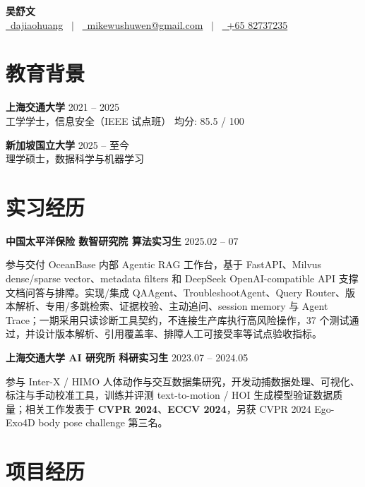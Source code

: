 \documentclass[a4paper,9pt]{extarticle}
\begin{document}
\pagestyle{empty}

\begin{center}
  {\LARGE\bfseries 吴舒文} \\[4pt]
  {\small
    \href{https://github.com/dajiaohuang}{\faGithub\ dajiaohuang} \ $|$ \
    \href{mailto:mikewushuwen@gmail.com}{\faEnvelope\ mikewushuwen@gmail.com} \ $|$ \
    \href{tel:+65 82737235}{\faMobile\ +65 82737235}
  }
\end{center}

\section{教育背景}
\textbf{上海交通大学} \hfill 2021 -- 2025 \\
工学学士，信息安全（IEEE 试点班） \hfill 均分: 85.5 / 100

\textbf{新加坡国立大学} \hfill 2025 -- 至今 \\
理学硕士，数据科学与机器学习

\section{实习经历}

\noindent\textbf{中国太平洋保险 数智研究院 \quad 算法实习生} \hfill 2025.02 -- 07

{\small 参与交付 OceanBase 内部 Agentic RAG 工作台，基于 FastAPI、Milvus dense/sparse vector、metadata filters 和 DeepSeek OpenAI-compatible API 支撑文档问答与排障。实现/集成 QAAgent、TroubleshootAgent、Query Router、版本解析、专用/多跳检索、证据校验、主动追问、session memory 与 Agent Trace；一期采用只读诊断工具契约，不连接生产库执行高风险操作，37 个测试通过，并设计版本解析、引用覆盖率、排障人工可接受率等试点验收指标。}

\vspace{3pt}
\noindent\textbf{上海交通大学 AI 研究所 \quad 科研实习生} \hfill 2023.07 -- 2024.05

{\small 参与 Inter-X / HIMO 人体动作与交互数据集研究，开发动捕数据处理、可视化、标注与手动校准工具，训练并评测 text-to-motion / HOI 生成模型验证数据质量；相关工作发表于 \textbf{CVPR 2024}、\textbf{ECCV 2024}，另获 CVPR 2024 Ego-Exo4D body pose challenge 第三名。}

\section{项目经历}
\end{document}
